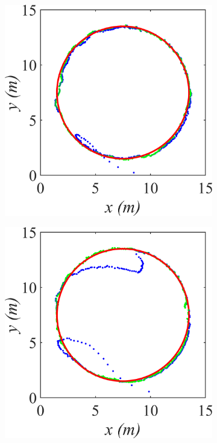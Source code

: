 \begin{figure}
\begin{subfigure}[tb]{0.2\textwidth}
        \includegraphics[width=\textwidth]{img/KL_1.png}
        \caption{}
    \end{subfigure}
        \begin{subfigure}[tb]{0.2\textwidth}
        \includegraphics[width=\textwidth]{img/KL_2.png}

\end{subfigure}
\end{figure}
